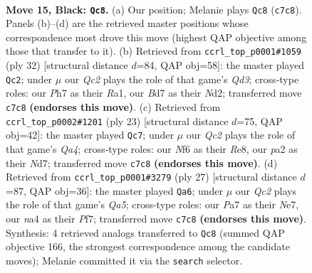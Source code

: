 \documentclass[11pt]{article}
\begin{document}
\clearpage

\begin{figure}[p]\centering
\begin{subfigure}{0.46\textwidth}\centering
\resizebox{\linewidth}{!}{%
\newchessgame
\chessboard[
  setfen={rn2r1k1/ppqbbppp/4pn2/2Pp4/N2P4/5N2/PP1B1PPP/1BRQR1K1 b - - 16 15},
  showmover=false,
  pgfstyle=straightmove, color=movearrow, markmove={c7-c8}
]}
\caption{}
\end{subfigure}\hfill
\begin{subfigure}{0.46\textwidth}\centering
\resizebox{\linewidth}{!}{%
\newchessgame
\chessboard[
  setfen={r1bq1rk1/2p1npb1/2np3p/p5p1/P1B1P3/2PQBN2/3N1PPP/R3R1K1 w - - 0 17},
  showmover=false,
  pgfstyle=straightmove, color=movearrow, markmove={d3-c2}
]}
\caption{}
\end{subfigure}
\\[4pt]
\begin{subfigure}{0.46\textwidth}\centering
\resizebox{\linewidth}{!}{%
\newchessgame
\chessboard[
  setfen={r1b1r1k1/pp1n1pbp/2pp1np1/q7/P2BP3/2N2N2/1PPQBPPP/R3R1K1 b - - 2 12},
  showmover=false,
  pgfstyle=straightmove, color=movearrow, markmove={a5-c7}
]}
\caption{}
\end{subfigure}\hfill
\begin{subfigure}{0.46\textwidth}\centering
\resizebox{\linewidth}{!}{%
\newchessgame
\chessboard[
  setfen={2kr1b1r/ppp1npp1/2n1p1b1/6Pp/q6P/2NP1N2/PPPBQPB1/1K1R3R b - - 6 14},
  showmover=false,
  pgfstyle=straightmove, color=movearrow, markmove={a4-a6}
]}
\caption{}
\end{subfigure}
\caption{\textbf{Move 15, Black: \texttt{Qc8}.} (a) Our position; Melanie plays \texttt{Qc8} (\texttt{c7c8}). Panels (b)--(d) are the retrieved master positions whose correspondence most drove this move (highest QAP objective among those that transfer to it). (b) Retrieved from \texttt{ccrl\_top\_p0001\#1059} (ply 32) [structural distance $d$=84, QAP obj=58]: the master played \texttt{Qc2}; under $\mu$ our \emph{Qc2} plays the role of that game's \emph{Qd3}; cross-type roles: our \emph{P}h7 as their \emph{R}a1, our \emph{B}d7 as their \emph{N}d2; transferred move \texttt{c7c8} \textbf{(endorses this move)}. (c) Retrieved from \texttt{ccrl\_top\_p0002\#1201} (ply 23) [structural distance $d$=75, QAP obj=42]: the master played \texttt{Qc7}; under $\mu$ our \emph{Qc2} plays the role of that game's \emph{Qa4}; cross-type roles: our \emph{N}f6 as their \emph{R}e8, our \emph{p}a2 as their \emph{N}d7; transferred move \texttt{c7c8} \textbf{(endorses this move)}. (d) Retrieved from \texttt{ccrl\_top\_p0001\#3279} (ply 27) [structural distance $d$=87, QAP obj=36]: the master played \texttt{Qa6}; under $\mu$ our \emph{Qc2} plays the role of that game's \emph{Qa5}; cross-type roles: our \emph{P}a7 as their \emph{N}e7, our \emph{n}a4 as their \emph{P}f7; transferred move \texttt{c7c8} \textbf{(endorses this move)}. Synthesis: 4 retrieved analogs transferred to \texttt{Qc8} (summed QAP objective 166, the strongest correspondence among the candidate moves); Melanie committed it via the \texttt{search} selector.}
\label{fig:thought-m29}
\end{figure}
\end{document}
